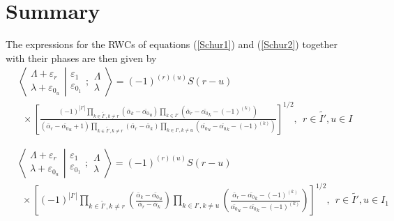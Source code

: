 \documentclass[12pt]{article}
\def\nn{\nonumber}
\begin{document}
\section{Summary}

The expressions for the RWCs of equations (\ref{Schur1}) and (\ref{Schur2}) together with their phases \cite{GIW2,GIW3} are then given by
\begin{align}
& \left\langle\left. 
\begin{array}{c} \Lambda+\varepsilon_r\\ \lambda+\varepsilon_{0_u} 
 \end{array}
\right|\right.
\left.
\begin{array}{c} \varepsilon_1 \\ \varepsilon_{0_1} 
 \end{array}
; \begin{array}{c} \Lambda \\ \lambda
 \end{array}
\right\rangle = (-1)^{(r)(u)} S(r-u) \nn\\
&~~\times 
\left[ 
\frac{
(-1)^{|I'|} \prod_{k\in\tilde{I'},k \neq r} \left(\bar{\alpha}_k - \bar{\alpha_0}_u \right)
\prod_{k\in I'} \left(\bar{\alpha}_r - \bar{\alpha_0}_k - (-1)^{(k)}\right) 
}
{
(\bar{\alpha}_r-\bar{\alpha_0}_u + 1)
\prod_{k\in \tilde{I'},k\neq r} \left(\bar{\alpha}_r - \bar{\alpha}_k \right)
\prod_{k\in I',k\neq u} \left(\bar{\alpha_0}_u - \bar{\alpha_0}_k - (-1)^{(k)}\right)
}
\right]^{1/2}
, \ \ r\in \tilde{I'},u\in I   \label{FinalBarredEven}
\end{align}


\begin{align}
& \left\langle\left. 
\begin{array}{c} \Lambda+\varepsilon_r\\ \lambda+\varepsilon_{0_u} 
 \end{array}
\right|\right.
\left.
\begin{array}{c} \varepsilon_1 \\ \varepsilon_{0_1} 
 \end{array}
; \begin{array}{c} \Lambda \\ \lambda
 \end{array}
\right\rangle = (-1)^{(r)(u)} S(r-u) \nn\\
&~~\times \left[ (-1)^{|I'|} \prod_{k\in \tilde{I'},k\neq r} 
\left(
\frac 
{\bar{\alpha}_k - \bar{\alpha_0}_u  }
{\bar{\alpha}_r - \bar{\alpha}_k }
\right)
\prod_{k\in I',k \neq u} 
\left(
\frac
{ \bar{\alpha}_r - \bar{\alpha_0}_k - (-1)^{(k)} }
{\bar{\alpha_0}_u - \bar{\alpha_0}_k - (-1)^{(k)} }
\right)
\right]^{1/2}
,\ \ r\in \tilde{I'},u\in I_1 \label{FinalBarredOdd}
\end{align}
\end{document}
